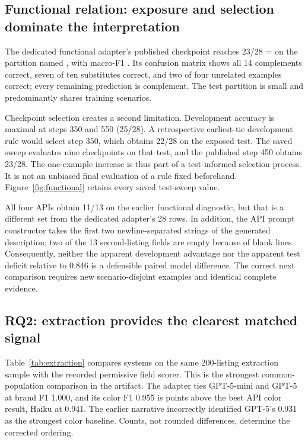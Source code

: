 \subsection{Functional relation: exposure and selection dominate the interpretation}
The dedicated functional adapter's published checkpoint reaches 23/28 = \FunctionalAccuracy{} on the partition named , with macro-F1 \FunctionalMacroF{}. Its confusion matrix shows all 14 complements correct, seven of ten substitutes correct, and two of four unrelated examples correct; every remaining prediction is complement. The test partition is small and predominantly shares training scenarios.

Checkpoint selection creates a second limitation. Development accuracy is maximal at steps 350 and 550 (25/28). A retrospective earliest-tie development rule would select step 350, which obtains 22/28 on the exposed test. The saved sweep evaluates nine checkpoints on that test, and the published step 450 obtains 23/28. The one-example increase is thus part of a test-informed selection process. It is not an unbiased final evaluation of a rule fixed beforehand. Figure~\ref{fig:functional} retains every saved test-sweep value.



All four APIs obtain 11/13 on the earlier functional diagnostic, but that is a different set from the dedicated adapter's 28 rows. In addition, the API prompt constructor takes the first two newline-separated strings of the generated description; two of the 13 second-listing fields are empty because of blank lines. Consequently, neither the apparent development advantage nor the apparent test deficit relative to 0.846 is a defensible paired model difference. The correct next comparison requires new scenario-disjoint examples and identical complete evidence.

\subsection{RQ2: extraction provides the clearest matched signal}
\label{sec:extraction}
Table~\ref{tab:extraction} compares systems on the same 200-listing extraction sample with the recorded permissive field scorer. This is the strongest common-population comparison in the artifact. The adapter ties GPT-5-mini and GPT-5 at brand F1 1.000, and its color F1 0.955 is \ExtractionColorDelta{} points above the best API color result, Haiku at 0.941. The earlier narrative incorrectly identified GPT-5's 0.931 as the strongest color baseline. Counts, not rounded differences, determine the corrected ordering.

